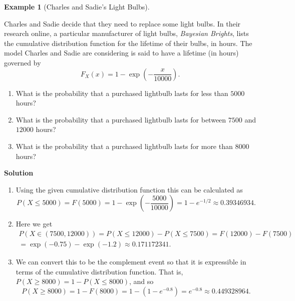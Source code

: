 \documentclass[
  letterpaper,
  DIV=11,
  numbers=noendperiod]{scrreprt}
\providecommand{\tightlist}{%
  \setlength{\itemsep}{0pt}\setlength{\parskip}{0pt}}\usepackage{longtable,booktabs,array}
\theoremstyle{definition}
\theoremstyle{definition}
\newtheorem{example}{Example}[chapter]
\theoremstyle{definition}
\theoremstyle{remark}
\begin{document}
\begin{example}[Charles and Sadie's Light
Bulbs]\protect\hypertarget{exm-lightbulb-cdf}{}\label{exm-lightbulb-cdf}

Charles and Sadie decide that they need to replace some light bulbs. In
their research online, a particular manufacturer of light bulbs,
\emph{Bayesian Brights}, lists the cumulative distribution function for
the lifetime of their bulbs, in hours. The model Charles and Sadie are
considering is said to have a lifetime (in hours) governed by
\[F_X(x) = 1 - \exp\left(-\frac{x}{10000}\right).\]

\begin{enumerate}
\def\labelenumi{\alph{enumi}.}
\tightlist
\item
  What is the probability that a purchased lightbulb lasts for less than
  \(5000\) hours?
\item
  What is the probability that a purchased lightbulb lasts for between
  \(7500\) and \(12000\) hours?
\item
  What is the probability that a purchased lightbulb lasts for more than
  \(8000\) hours?
\end{enumerate}

\begin{tcolorbox}[enhanced jigsaw, colback=white, colframe=quarto-callout-color-frame, arc=.35mm, leftrule=.75mm, rightrule=.15mm, opacityback=0, breakable, bottomrule=.15mm, left=2mm, toprule=.15mm]

\vspace{-3mm}\textbf{Solution}\vspace{3mm}

\begin{enumerate}
\def\labelenumi{\alph{enumi}.}
\tightlist
\item
  Using the given cumulative distribution function this can be
  calculated as
  \[P(X \leq 5000) = F(5000) = 1 - \exp\left(-\frac{5000}{10000}\right) = 1 - e^{-1/2} \approx 0.39346934.\]
\item
  Here we get
  \begin{multline*}P(X \in (7500,12000)) = P(X \leq 12000) - P(X\leq 7500) = F(12000) - F(7500) \\
  = \exp\left(-0.75\right) - \exp\left(-1.2\right) \approx 0.171172341.\end{multline*}
\item
  We can convert this to be the complement event so that it is
  expressible in terms of the cumulative distribution function. That is,
  \(P(X \geq 8000) = 1 - P(X \leq 8000)\), and so
  \[P(X \geq 8000) = 1 - F(8000) = 1 - (1 - e^{-0.8}) = e^{-0.8} \approx 0.449328964.\]
\end{enumerate}

\end{tcolorbox}

\end{example}
\end{document}
